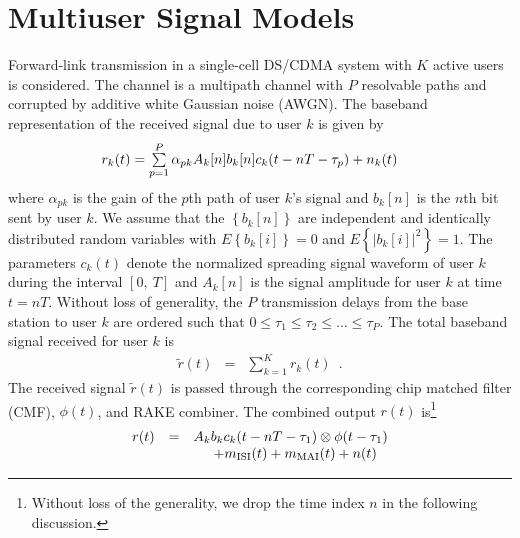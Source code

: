 \documentclass[conference]{IEEEtran}
\begin{document}
\section{Multiuser Signal Models}

Forward-link transmission in a single-cell DS/CDMA system
with $K$ active users is considered. The channel is a multipath
channel with $P$ resolvable paths and corrupted by additive white
Gaussian noise (AWGN).  The baseband representation of the received
signal due to user $k$ is given by
\begin{equation}
\begin{array}{l}\hspace{-0.2in}
r_k(t)=\sum\limits_{p=1}^{P}\alpha_{pk}A_k[n]
b_k[n]c_k(t-nT-\tau_p)+n_k(t)
\end{array}
\end{equation}
where $\alpha_{pk}$ is the gain of the $p$th path of user $k$'s
signal and $b_k{[n]}$ is the $n$th bit sent by user $k$. We assume
that the $\left\{b_k{[n]}\right\}$ are independent and identically
distributed random variables with $E\left\{b_k{[i]}\right\}=0$ and
$E\left\{|b_k{[i]}|^2\right\}=1$. The parameters $c_k(t)$ denote
the normalized spreading signal waveform of user $k$ during the
interval $[0,\ T]$ and $A_k[n]$ is the signal amplitude for user
$k$ at time $t=nT$.  Without loss of generality, the $P$ transmission delays from the base station to user $k$ are ordered such that $0\leq\tau_1\leq\tau_2\leq\ldots\leq\tau_P$.  The total baseband signal received for user $k$ is
\begin{equation}
\begin{array}{rcl}
\tilde{r}(t)&=&\sum\limits_{k=1}^{K}r_k(t) \enspace .
\end{array}
\end{equation}
The received signal $\tilde{r}(t)$ is passed through the
corresponding chip matched filter (CMF), $\phi(t)$, and RAKE
combiner. The combined output $r(t)$ is\footnote{Without loss of
the generality, we drop the time index $n$ in the following
discussion.}
\begin{equation}\hspace{-0.0in}
\begin{array}{rcl}
r(t)&=&A_k b_k c_k(t-nT-\tau_1)\otimes \phi(t-\tau_1) \\
&&\hspace{0.2in} + m_{\rm ISI}(t) + m_{\rm MAI}(t) + n(t)
\end{array}\label{r_t}
\end{equation}
\end{document}
